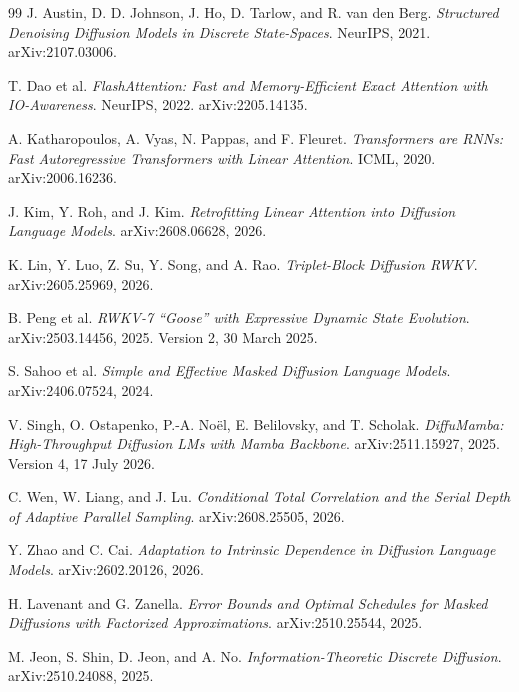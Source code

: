 \begin{thebibliography}{99}
 J. Austin, D. D. Johnson, J. Ho, D. Tarlow, and R. van den Berg. \emph{Structured Denoising Diffusion Models in Discrete State-Spaces}. NeurIPS, 2021. arXiv:2107.03006.

 T. Dao et al. \emph{FlashAttention: Fast and Memory-Efficient Exact Attention with IO-Awareness}. NeurIPS, 2022. arXiv:2205.14135.

 A. Katharopoulos, A. Vyas, N. Pappas, and F. Fleuret. \emph{Transformers are RNNs: Fast Autoregressive Transformers with Linear Attention}. ICML, 2020. arXiv:2006.16236.

 J. Kim, Y. Roh, and J. Kim. \emph{Retrofitting Linear Attention into Diffusion Language Models}. arXiv:2608.06628, 2026.

 K. Lin, Y. Luo, Z. Su, Y. Song, and A. Rao. \emph{Triplet-Block Diffusion RWKV}. arXiv:2605.25969, 2026.

 B. Peng et al. \emph{RWKV-7 ``Goose'' with Expressive Dynamic State Evolution}. arXiv:2503.14456, 2025. Version 2, 30 March 2025.

 S. Sahoo et al. \emph{Simple and Effective Masked Diffusion Language Models}. arXiv:2406.07524, 2024.

 V. Singh, O. Ostapenko, P.-A. No\"el, E. Belilovsky, and T. Scholak. \emph{DiffuMamba: High-Throughput Diffusion LMs with Mamba Backbone}. arXiv:2511.15927, 2025. Version 4, 17 July 2026.

 C. Wen, W. Liang, and J. Lu. \emph{Conditional Total Correlation and the Serial Depth of Adaptive Parallel Sampling}. arXiv:2608.25505, 2026.

 Y. Zhao and C. Cai. \emph{Adaptation to Intrinsic Dependence in Diffusion Language Models}. arXiv:2602.20126, 2026.

 H. Lavenant and G. Zanella. \emph{Error Bounds and Optimal Schedules for Masked Diffusions with Factorized Approximations}. arXiv:2510.25544, 2025.

 M. Jeon, S. Shin, D. Jeon, and A. No. \emph{Information-Theoretic Discrete Diffusion}. arXiv:2510.24088, 2025.
\end{thebibliography}

